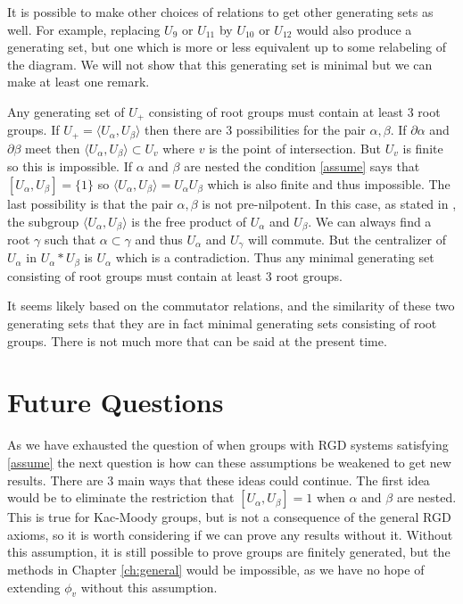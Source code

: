 \documentclass[class=book, crop=false]{standalone}
\begin{document}
It is possible to make other choices of relations to get other generating sets as well. For example, replacing $U_9$ or $U_{11}$ by $U_{10}$ or $U_{12}$ would also produce a generating set, but one which is more or less equivalent up to some relabeling of the diagram. We will not show that this generating set is minimal but we can make at least one remark.

Any generating set of $U_+$ consisting of root groups must contain at least 3 root groups. If $U_+=\langle U_\alpha,U_\beta\rangle$ then there are 3 possibilities for the pair $\alpha,\beta.$ If $\partial\alpha$ and $\partial\beta$ meet then $\langle U_\alpha,U_\beta\rangle\subset U_v$ where $v$ is the point of intersection. But $U_v$ is finite so this is impossible. If $\alpha$ and $\beta$ are nested the condition \eqref{assume} says that $[U_\alpha,U_\beta]=\{1\}$ so $\langle U_\alpha,U_\beta\rangle=U_\alpha U_\beta$ which is also finite and thus impossible. The last possibility is that the pair $\alpha,\beta$ is not pre-nilpotent. In this case, as stated in \cite{free}, the subgroup $\langle U_\alpha,U_\beta\rangle$ is the free product of $U_\alpha$ and $U_\beta.$ We can always find a root $\gamma$ such that $\alpha\subset \gamma$ and thus $U_\alpha$ and $U_\gamma$ will commute. But the centralizer of $U_\alpha$ in $U_\alpha\ast U_\beta$ is $U_\alpha$ which is a contradiction. Thus any minimal generating set consisting of root groups must contain at least 3 root groups. 

It seems likely based on the commutator relations, and the similarity of these two generating sets that they are in fact minimal generating sets consisting of root groups. There is not much more that can be said at the present time.

\clearpage
\section{Future Questions}
As we have exhausted the question of when groups with RGD systems satisfying \eqref{assume} the next question is how can these assumptions be weakened to get new results. There are 3 main ways that these ideas could continue. The first idea would be to eliminate the restriction that $[U_\alpha,U_\beta]=1$ when $\alpha$ and $\beta$ are nested. This is true for Kac-Moody groups, but is not a consequence of the general RGD axioms, so it is worth considering if we can prove any results without it. Without this assumption, it is still possible to prove groups are finitely generated, but the methods in Chapter \ref{ch:general} would be impossible, as we have no hope of extending $\phi_v$ without this assumption.
\end{document}
